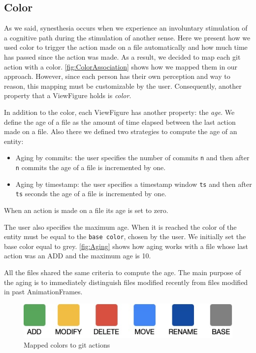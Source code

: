 \subsection*{Color}

As we said, synesthesia occurs when we experience an involuntary stimulation of a cognitive path during the stimulation of another sense. Here we present how we used color to trigger the action made on a file automatically and how much time has passed since the action was made. 
As a result, we decided to map each git action with a color. \autoref{fig:ColorAssociation} shows how we mapped them in our approach. However, since each person has their own perception and way to reason, this mapping must be customizable by the user. Consequently, another property that a ViewFigure holds is \textit{color}.

In addition to the color, each ViewFigure has another property: the \textit{age}. We define the age of a file as the amount of time elapsed between the last action made on a file. Also there we defined two strategies to compute the age of an entity:

\begin{itemize}
    \item{Aging by commits}: the user specifies the number of commits \texttt{n} and then after \texttt{n} commits the age of a file is incremented by one. 
    \item{Aging by timestamp}:  the user specifies a timestamp window \texttt{ts} and then after \texttt{ts} seconds the age of a file is incremented by one.
\end{itemize}

When an action is made on a file its age is set to zero. 

The user also specifies the maximum age. When it is reached the color of the entity must be equal to the \texttt{base color}, chosen by the user. 
We initially set the base color equal to grey. \autoref{fig:Aging} shows how aging works with a file whose last action was an ADD and the maximum age is 10. 

All the files shared the same criteria to compute the age. The main purpose of the aging is to immediately distinguish files modified recently from files modified in past AnimationFrames.

\begin{figure}
    \center
    \includegraphics[width=0.\textwidth]{ColorMapping.jpg}
    \caption{Mapped colors to git actions}
    \label{fig:ColorAssociation}
\end{figure}


